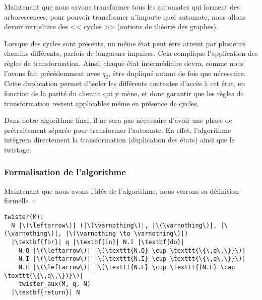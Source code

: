 Maintenant que nous savons transformer tous les automates qui forment des
arborescences, pour pouvoir transformer n'importe quel automate, nous allons
devoir introduire des << cycles >> (notions de théorie des graphes).

\vphantom{}

Lorsque des cycles sont présents, un même état peut être atteint par plusieurs
chemins différents, parfois de longueurs impaires. Cela complique
l'application des règles de transformation. Ainsi, chaque état intermédiaire
devra, comme nous l’avons fait précédemment avec \(q_2\), être dupliqué autant
de fois que nécessaire. Cette duplication permet d’isoler les différents
contextes d’accès à cet état, en fonction de la parité du chemin qui y mène,
et donc garantir que les règles de transformation restent applicables même en
présence de cycles.

\vphantom{}

Dans notre algorithme final, il ne sera pas nécessaire d’avoir une phase de
prétraitement séparée pour transformer l’automate. En effet, l’algorithme
intégrera directement la transformation (duplication des états) ainsi que le
twistage.

\subsubsection{Formalisation de l'algorithme}

Maintenant que nous avons l'idée de l'algorithme, nous verrons sa
définition formelle~:
\begin{verbatim}
twister(M):
  N |\(\leftarrow\)| (|\(\varnothing\)|, |\(\varnothing\)|, |\(\varnothing\)|, |\(\varnothing \to \varnothing\)|)
  |\textbf{for}| q |\textbf{in}| N.I |\textbf{do}|
    N.Q |\(\leftarrow\)| |\(\texttt{N.Q} \cup \texttt{\{\,q\,\}}\)|
    N.I |\(\leftarrow\)| |\(\texttt{N.I} \cup \texttt{\{\,q\,\}}\)|
    N.F |\(\leftarrow\)| |\(\texttt{N.F} \cup \texttt{(N.F} \cap \texttt{\{\,q\,\})}\)|
    twister_aux(M, q, N)
  |\textbf{return}| N
\end{verbatim}

